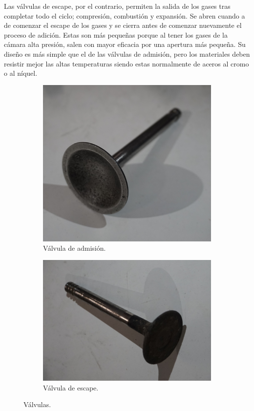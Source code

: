 Las válvulas de escape, por el contrario, permiten la salida de los gases tras completar todo el ciclo; compresión, combustión y expansión. Se abren cuando a de comenzar el escape de los gases y se cierra antes de comenzar nuevamente el proceso de adición. Estas son más pequeñas porque al tener los gases de la cámara alta presión, salen con mayor eficacia por una apertura más pequeña. Su diseño es más simple que el de las válvulas de admisión, pero los materiales deben resistir mejor las altas temperaturas siendo estas normalmente de aceros al cromo o al níquel.


\begin{figure}[H]
	\centering
	\begin{subfigure}[b]{0.45\textwidth}
		\centering
		\includegraphics[width=\linewidth]{Figures/01/m2/val_adm.jpg}
		\caption{Válvula de admisión.}
		\label{fig:int_val}
	\end{subfigure}
	\hfill
	\begin{subfigure}[b]{0.45\textwidth}
 		\centering
 		\includegraphics[width=\linewidth]{Figures/01/m2/val_esc.jpg}
 		\caption{Válvula de escape.}
		\label{fig:ex_val}
	\end{subfigure}    
	\caption{Válvulas.}
	\label{fig:valvs}
\end{figure}


